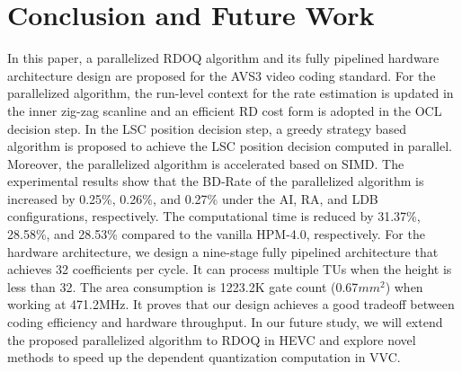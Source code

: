 \documentclass[lettersize,journal]{IEEEtran}
\begin{document}
\section{Conclusion and Future Work}
\label{sec:6}
In this paper, a parallelized RDOQ algorithm and its fully pipelined hardware architecture design are proposed for the AVS3 video coding standard. For the parallelized algorithm, the run-level context for the rate estimation is updated in the inner zig-zag scanline and an efficient RD cost form is adopted in the OCL decision step. In the LSC position decision step, a greedy strategy based algorithm is proposed to achieve the LSC position decision computed in parallel. Moreover, the parallelized algorithm is accelerated based on SIMD. The experimental results show that the BD-Rate of the parallelized algorithm is increased by 0.25\%, 0.26\%, and 0.27\% under the AI, RA, and LDB configurations, respectively. The computational time is reduced by 31.37\%, 28.58\%, and 28.53\% compared to the vanilla HPM-4.0, respectively. 
For the hardware architecture, we design a nine-stage fully pipelined architecture that achieves 32 coefficients per cycle. It can process multiple TUs when the height is less than 32. The area consumption is 1223.2K gate count (0.67$mm^{2}$) when working at 471.2MHz. It proves that our design achieves a good tradeoff between coding efficiency and hardware throughput. 
In our future study, we will extend the proposed parallelized algorithm to RDOQ in HEVC and explore novel methods to speed up the dependent quantization computation in VVC. 



\end{document}
